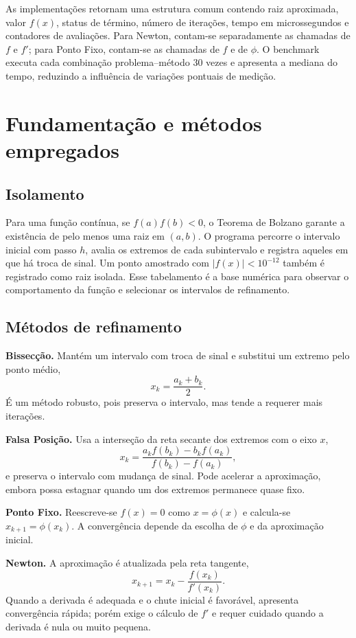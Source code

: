 \documentclass[12pt,a4paper]{article}
\begin{document}
As implementações retornam uma estrutura comum contendo raiz aproximada, valor $f(x)$, status de término, número de iterações, tempo em microssegundos e contadores de avaliações. Para Newton, contam-se separadamente as chamadas de $f$ e $f'$; para Ponto Fixo, contam-se as chamadas de $f$ e de $\phi$. O benchmark executa cada combinação problema--método 30 vezes e apresenta a mediana do tempo, reduzindo a influência de variações pontuais de medição.

\section{Fundamentação e métodos empregados}

\subsection{Isolamento}

Para uma função contínua, se $f(a)f(b)<0$, o Teorema de Bolzano garante a existência de pelo menos uma raiz em $(a,b)$. O programa percorre o intervalo inicial com passo $h$, avalia os extremos de cada subintervalo e registra aqueles em que há troca de sinal. Um ponto amostrado com $|f(x)|<10^{-12}$ também é registrado como raiz isolada. Esse tabelamento é a base numérica para observar o comportamento da função e selecionar os intervalos de refinamento.

\subsection{Métodos de refinamento}

\textbf{Bissecção.} Mantém um intervalo com troca de sinal e substitui um extremo pelo ponto médio,
\[
x_k=\frac{a_k+b_k}{2}.
\]
É um método robusto, pois preserva o intervalo, mas tende a requerer mais iterações.

\textbf{Falsa Posição.} Usa a interseção da reta secante dos extremos com o eixo $x$,
\[
x_k=\frac{a_kf(b_k)-b_kf(a_k)}{f(b_k)-f(a_k)},
\]
e preserva o intervalo com mudança de sinal. Pode acelerar a aproximação, embora possa estagnar quando um dos extremos permanece quase fixo.

\textbf{Ponto Fixo.} Reescreve-se $f(x)=0$ como $x=\phi(x)$ e calcula-se $x_{k+1}=\phi(x_k)$. A convergência depende da escolha de $\phi$ e da aproximação inicial.

\textbf{Newton.} A aproximação é atualizada pela reta tangente,
\[
x_{k+1}=x_k-\frac{f(x_k)}{f'(x_k)}.
\]
Quando a derivada é adequada e o chute inicial é favorável, apresenta convergência rápida; porém exige o cálculo de $f'$ e requer cuidado quando a derivada é nula ou muito pequena.
\end{document}
